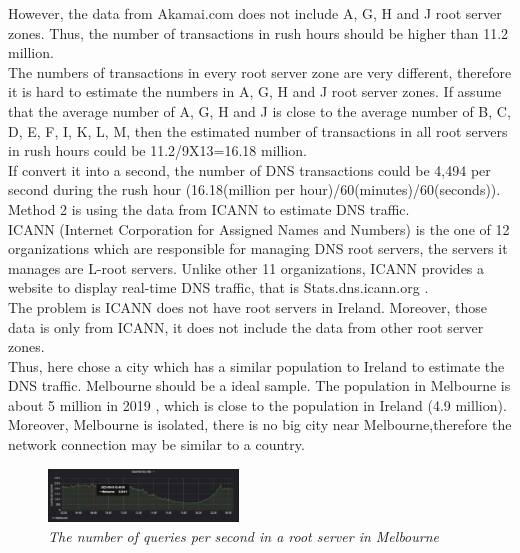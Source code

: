 \documentclass[conference]{IEEEtran}
\begin{document}
However, the data from Akamai.com does not include A, G, H and J root server zones. Thus, the number of transactions in rush hours should be higher than 11.2 million.
\\

The numbers of transactions in every root server zone are very different, therefore it is hard to estimate the numbers in A, G, H and J root server zones. If assume that the average number of A, G, H and J is close to the average number of B, C, D, E, F, I, K, L, M, then the estimated number of transactions in all root servers in rush hours could be 11.2/9X13=16.18 million.
\\

If convert it into a second, the number of DNS transactions could be 4,494 per second during the rush hour (16.18(million per hour)/60(minutes)/60(seconds)).
\\

Method 2 is using the data from ICANN to estimate DNS traffic. 
\\

ICANN (Internet Corporation for Assigned Names and Numbers) is the one of 12 organizations which are responsible for managing DNS root servers, the servers it manages are L-root servers. Unlike other 11 organizations, ICANN provides a website to display real-time DNS traffic, that is Stats.dns.icann.org \cite{stats_dns_icann_org}.
\\

The problem is ICANN does not have root servers in Ireland. Moreover, those data is only from ICANN, it does not include the data from other root server zones.
\\

Thus, here chose a city which has a similar population to Ireland to estimate the DNS traffic. Melbourne should be a ideal sample. The population in Melbourne is about 5 million in 2019 \cite{Melbourne_wiki}, which is close to the population in Ireland (4.9 million). Moreover, Melbourne is isolated, there is no big city near Melbourne,therefore the network connection may be similar to a country.
\\

\begin{figure}[hbt!]
    \centering
    \includegraphics[width=0.45\textwidth]{figure/melbourne.jpg}
    \caption{\em The number of queries per second in a root server in Melbourne \cite{stats_dns_icann_org} }
    \label{tab:figure_melbourne}
\end{figure}
\end{document}

